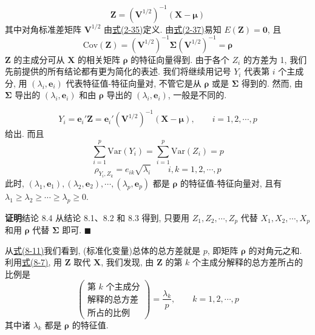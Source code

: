 
\label{eq:8-10}
\begin{equation}
\mathbf{Z}=(\mathbf{V}^{1/2})^{-1}(\mathbf{X}-\boldsymbol{\mu})
\tag{8-10}
\end{equation}
其中对角标准差矩阵 $\mathbf{V}^{1/2}$ 由\hyperref[eq:2-35]{式(2-35)}定义. 由\hyperref[eq:2-37]{式(2-37)}易知 $E(\mathbf{Z})=\mathbf{0}$, 且
\[
\mathrm{Cov}(\mathbf{Z})=(\mathbf{V}^{1/2})^{-1}\boldsymbol{\Sigma}(\mathbf{V}^{1/2})^{-1}=\boldsymbol{\rho}
\]
$\mathbf{Z}$ 的主成分可从 $\mathbf{X}$ 的相关矩阵 $\boldsymbol{\rho}$ 的特征向量得到. 由于各个 $Z_i$ 的方差为 1, 我们先前提供的所有结论都有更为简化的表述. 我们将继续用记号 $Y_i$ 代表第 $i$ 个主成分, 用 $(\lambda_i,\mathbf{e}_i)$ 代表特征值-特征向量对, 不管它是从 $\boldsymbol{\rho}$ 或是 $\boldsymbol{\Sigma}$ 得到的. 然而, 由 $\boldsymbol{\Sigma}$ 导出的 $(\lambda_i,\mathbf{e}_i)$ 和由 $\boldsymbol{\rho}$ 导出的 $(\lambda_i,\mathbf{e}_i)$, 一般是不同的.

\[
Y_i=\mathbf{e}_i'\mathbf{Z}=\mathbf{e}_i'(\mathbf{V}^{1/2})^{-1}(\mathbf{X}-\boldsymbol{\mu}),\qquad i=1,2,\cdots,p
\]
给出. 而且
\label{eq:8-11}
\begin{equation}
\sum_{i=1}^{p}\mathrm{Var}(Y_i)=\sum_{i=1}^{p}\mathrm{Var}(Z_i)=p
\tag{8-11}
\end{equation}
\[
\rho_{Y_i,Z_k}=e_{ik}\sqrt{\lambda_i}\qquad i,k=1,2,\cdots,p
\]
此时, $(\lambda_1,\mathbf{e}_1),(\lambda_2,\mathbf{e}_2),\cdots,(\lambda_p,\mathbf{e}_p)$ 都是 $\boldsymbol{\rho}$ 的特征值-特征向量对, 且有 $\lambda_1\geqslant\lambda_2\geqslant\cdots\geqslant\lambda_p\geqslant 0$.

\noindent\textbf{证明}\quad 结论 8.4 从结论 8.1、8.2 和 8.3 得到, 只要用 $Z_1,Z_2,\cdots,Z_p$ 代替 $X_1,X_2,\cdots,X_p$ 和用 $\boldsymbol{\rho}$ 代替 $\boldsymbol{\Sigma}$ 即可. \hfill$\blacksquare$

从\hyperref[eq:8-11]{式(8-11)}我们看到, (标准化变量)总体的总方差就是 $p$, 即矩阵 $\boldsymbol{\rho}$ 的对角元之和. 利用\hyperref[eq:8-7]{式(8-7)}, 用 $\mathbf{Z}$ 取代 $\mathbf{X}$, 我们发现, 由 $\mathbf{Z}$ 的第 $k$ 个主成分解释的总方差所占的比例是
\label{eq:8-12}
\begin{equation}
\left(\begin{array}{c}
\text{第 }k\text{ 个主成分}\\
\text{解释的总方差}\\
\text{所占的比例}
\end{array}\right)=\frac{\lambda_k}{p},\qquad k=1,2,\cdots,p
\tag{8-12}
\end{equation}
其中诸 $\lambda_k$ 都是 $\boldsymbol{\rho}$ 的特征值.

